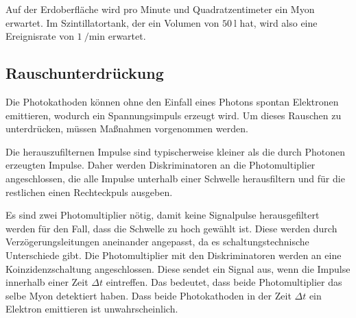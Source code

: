 Auf der Erdoberfläche wird pro Minute und Quadratzentimeter ein Myon erwartet. Im Szintillatortank, der ein Volumen von $\SI{50}{\litre}$ hat, wird also eine Ereignisrate von $\SI{1}{\per\minute}$ erwartet. %




\subsection{Rauschunterdrückung}
Die Photokathoden können ohne den Einfall eines Photons spontan Elektronen emittieren, wodurch ein Spannungsimpuls erzeugt wird. Um dieses Rauschen zu unterdrücken, müssen Maßnahmen vorgenommen werden.

Die herauszufilternen Impulse sind typischerweise kleiner als die durch Photonen erzeugten Impulse. Daher werden Diskriminatoren an die Photomultiplier angeschlossen, die alle Impulse unterhalb einer Schwelle herausfiltern und für die restlichen einen Rechteckpuls ausgeben.

Es sind zwei Photomultiplier nötig, damit keine Signalpulse herausgefiltert werden für den Fall, dass die Schwelle zu hoch gewählt ist. Diese werden durch Verzögerungsleitungen aneinander angepasst, da es schaltungstechnische Unterschiede gibt. Die Photomultiplier mit den Diskriminatoren werden an eine Koinzidenzschaltung angeschlossen. Diese sendet ein Signal aus, wenn die Impulse innerhalb einer Zeit $\Delta t$ eintreffen. Das bedeutet, dass beide Photomultiplier das selbe Myon detektiert haben. Dass beide Photokathoden in der Zeit $\Delta t$ ein Elektron emittieren ist unwahrscheinlich.